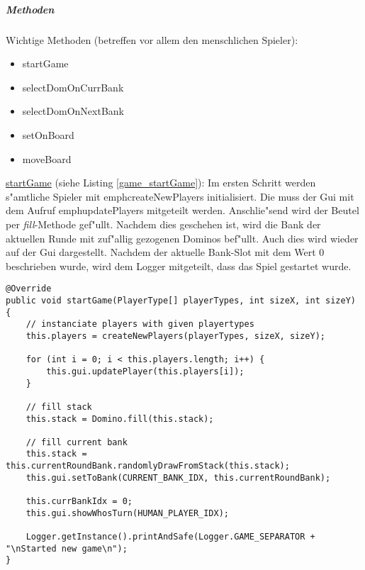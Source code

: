 \subparagraph{Methoden}
Wichtige Methoden (betreffen vor allem den menschlichen Spieler): 
\begin{itemize}
	\item startGame
	\item selectDomOnCurrBank
	\item selectDomOnNextBank
	\item setOnBoard
	\item moveBoard
\end{itemize}

\underline{startGame} (siehe Listing \ref{game_startGame}): Im ersten Schritt werden s"amtliche Spieler mit emph{createNewPlayers} initialisiert. Die muss der Gui mit dem Aufruf emph{updatePlayers} mitgeteilt werden. Anschlie"send wird der Beutel per \emph{fill}-Methode gef"ullt. Nachdem dies geschehen ist, wird die Bank der aktuellen Runde mit zuf"allig gezogenen Dominos bef"ullt. Auch dies wird wieder auf der Gui dargestellt. Nachdem der aktuelle Bank-Slot mit dem Wert 0 beschrieben wurde, wird dem Logger mitgeteilt, dass das Spiel gestartet wurde. 

\begin{lstlisting}[float,style=CodeHighlighting,label=game_startGame,caption=Game - startGame]
@Override
public void startGame(PlayerType[] playerTypes, int sizeX, int sizeY) {
    // instanciate players with given playertypes
    this.players = createNewPlayers(playerTypes, sizeX, sizeY);

    for (int i = 0; i < this.players.length; i++) {
        this.gui.updatePlayer(this.players[i]);
    }

    // fill stack
    this.stack = Domino.fill(this.stack);

    // fill current bank
    this.stack = this.currentRoundBank.randomlyDrawFromStack(this.stack);
    this.gui.setToBank(CURRENT_BANK_IDX, this.currentRoundBank);

    this.currBankIdx = 0;
    this.gui.showWhosTurn(HUMAN_PLAYER_IDX);

    Logger.getInstance().printAndSafe(Logger.GAME_SEPARATOR + "\nStarted new game\n");
}
\end{lstlisting}

